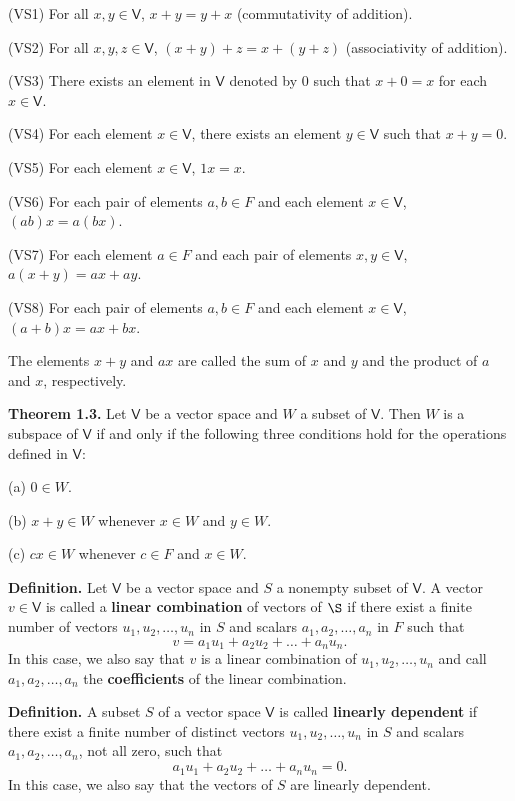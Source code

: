 \documentclass{article}
\newcommand{\0}{\mathit{0}}
\begin{document}
(VS1) For all $x, y \in \mathsf{V}$, $x + y = y + x$ (commutativity of addition).

(VS2) For all $x, y, z \in \mathsf{V}$, $(x + y) + z = x + (y + z)$
(associativity of addition).

(VS3) There exists an element in $\mathsf{V}$ denoted by $\0$ such that
$x + \0 = x$ for each $x \in \mathsf{V}$.

(VS4) For each element $x \in \mathsf{V}$, there exists an element
$y \in \mathsf{V}$ such that $x + y = \0$.

(VS5) For each element $x \in \mathsf{V}$, $1x = x$.

(VS6) For each pair of elements $a, b \in F$ and each element
$x \in \mathsf{V}$, $(ab)x = a(bx)$.

(VS7) For each element $a \in F$ and each pair of elements
$x, y \in \mathsf{V}$, $a(x + y) = ax + ay$.

(VS8) For each pair of elements $a, b \in F$ and each element
$x \in \mathsf{V}$, $(a + b)x = ax + bx$.

The elements $x + y$ and $ax$ are called the sum of $x$ and $y$ and the
product of $a$ and $x$, respectively.

\medskip

\textbf{Theorem 1.3.}
Let $\mathsf{V}$ be a vector space and $W$ a subset of
$\mathsf{V}$. Then $W$ is a subspace of $\mathsf{V}$ if and
only if the following three conditions hold for the operations
defined in $\mathsf{V}$:

(a) $\0 \in W$.

(b) $x + y \in W$ whenever $x \in W$ and $y \in W$.

(c) $c x \in W$ whenever $c \in F$ and $x \in W$.

\medskip

\textbf{Definition.}
Let $\mathsf{V}$ be a vector space and $S$ a nonempty subset of
$\mathsf{V}$. A vector $v \in \mathsf{V}$ is called a \textbf{linear combination}
of vectors of $\S$ if there exist a finite number of vectors
$u_1, u_2, \dots, u_n$ in $S$ and scalars $a_1, a_2, \dots, a_n$
in $F$ such that
\[
    v = a_1 u_1 + a_2 u_2 + \dots + a_n u_n.
\]
In this case, we also say that $v$ is a linear combination of
$u_1, u_2, \dots, u_n$ and call $a_1, a_2, \dots, a_n$ the \textbf{coefficients}
of the linear combination.

\medskip

\textbf{Definition.}
A subset $S$ of a vector space $\mathsf{V}$ is called \textbf{linearly
    dependent} if there exist a finite number of distinct vectors
$u_1, u_2, \dots, u_n$ in $S$ and scalars $a_1, a_2, \dots, a_n$,
not all zero, such that
\[
    a_1 u_1 + a_2 u_2 + \dots + a_n u_n = \0.
\]
In this case, we also say that the vectors of $S$ are linearly dependent.
\end{document}
